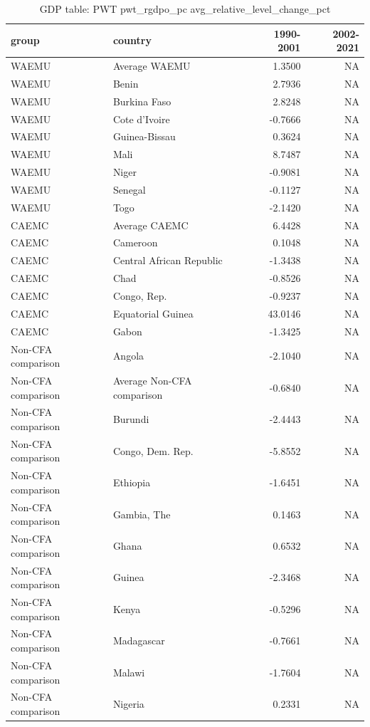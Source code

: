 \begin{table}

\caption{GDP table: PWT pwt_rgdpo_pc avg_relative_level_change_pct}
\centering
\begin{tabular}[t]{llrr}
\toprule
group & country & 1990-2001 & 2002-2021\\
\midrule
WAEMU & Average WAEMU & 1.3500 & NA\\
WAEMU & Benin & 2.7936 & NA\\
WAEMU & Burkina Faso & 2.8248 & NA\\
WAEMU & Cote d'Ivoire & -0.7666 & NA\\
WAEMU & Guinea-Bissau & 0.3624 & NA\\
\addlinespace
WAEMU & Mali & 8.7487 & NA\\
WAEMU & Niger & -0.9081 & NA\\
WAEMU & Senegal & -0.1127 & NA\\
WAEMU & Togo & -2.1420 & NA\\
CAEMC & Average CAEMC & 6.4428 & NA\\
\addlinespace
CAEMC & Cameroon & 0.1048 & NA\\
CAEMC & Central African Republic & -1.3438 & NA\\
CAEMC & Chad & -0.8526 & NA\\
CAEMC & Congo, Rep. & -0.9237 & NA\\
CAEMC & Equatorial Guinea & 43.0146 & NA\\
\addlinespace
CAEMC & Gabon & -1.3425 & NA\\
Non-CFA comparison & Angola & -2.1040 & NA\\
Non-CFA comparison & Average Non-CFA comparison & -0.6840 & NA\\
Non-CFA comparison & Burundi & -2.4443 & NA\\
Non-CFA comparison & Congo, Dem. Rep. & -5.8552 & NA\\
\addlinespace
Non-CFA comparison & Ethiopia & -1.6451 & NA\\
Non-CFA comparison & Gambia, The & 0.1463 & NA\\
Non-CFA comparison & Ghana & 0.6532 & NA\\
Non-CFA comparison & Guinea & -2.3468 & NA\\
Non-CFA comparison & Kenya & -0.5296 & NA\\
\addlinespace
Non-CFA comparison & Madagascar & -0.7661 & NA\\
Non-CFA comparison & Malawi & -1.7604 & NA\\
Non-CFA comparison & Nigeria & 0.2331 & NA\\

\end{tabular}
\end{table}
